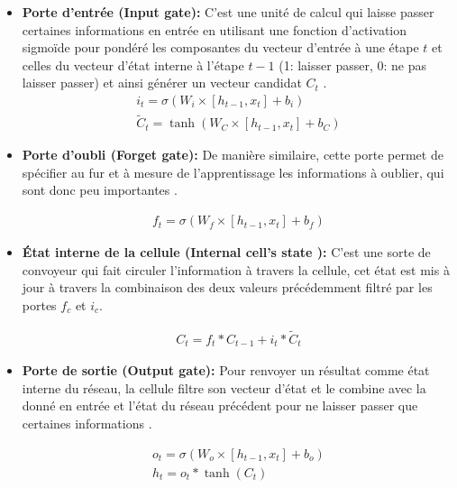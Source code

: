 		\begin{itemize}
			\item \textbf{Porte d'entrée (Input gate): } C'est une unité de calcul qui laisse passer certaines informations en entrée en utilisant une fonction d'activation sigmoïde pour pondéré les composantes du vecteur d'entrée à une étape $t$ et celles du vecteur d'état interne à l'étape $t-1$ (1: laisser passer, 0: ne pas laisser passer) et ainsi générer un vecteur candidat $C_t$ \cite{lstm_original_paper}.
			\begin{equation}
			\begin{gathered}
			i_t = \sigma(W_i \times [h_{t-1},x_t] + b_i) \\
			\tilde{C}_t = \tanh(W_C \times [h_{t-1},x_t] + b_C)
			\end{gathered}
			\end{equation}
			
			\item \textbf{Porte d'oubli (Forget gate): } De manière similaire, cette porte permet de spécifier au fur et à mesure de l'apprentissage les informations à oublier, qui sont donc peu importantes \cite{lstm_original_paper,rnn_lstms}.
			
			\begin{equation}
			\begin{gathered}
			f_t = \sigma(W_f \times [h_{t-1},x_t] + b_f)
			\end{gathered}
			\end{equation}
			
			\item \textbf{État interne de la cellule (Internal cell's state ): } C'est une sorte de convoyeur qui fait circuler l'information à travers la cellule, cet état est mis à jour à travers la combinaison des deux valeurs précédemment filtré par les portes $f_c$ et $i_c$\cite{lstm_original_paper}.
			
			\begin{equation}
			\begin{gathered}
			C_t = f_t * C_{t-1} + i_t*\tilde{C}_t
			\end{gathered}
			\end{equation}
			 
			\item \textbf{Porte de sortie (Output gate): } Pour renvoyer un résultat comme état interne du réseau, la cellule filtre son vecteur d'état et le combine avec la donné en entrée et l'état du réseau précédent pour ne laisser passer que certaines informations \cite{rnns_online,lstm_original_paper,rnn_lstms}.
			
			\begin{equation}
			\begin{gathered}
			o_t =  \sigma(W_o \times [h_{t-1},x_t] + b_o) \\
			h_t = o_t * \tanh(C_t)
			\end{gathered}
			\end{equation}
		\end{itemize}
	
